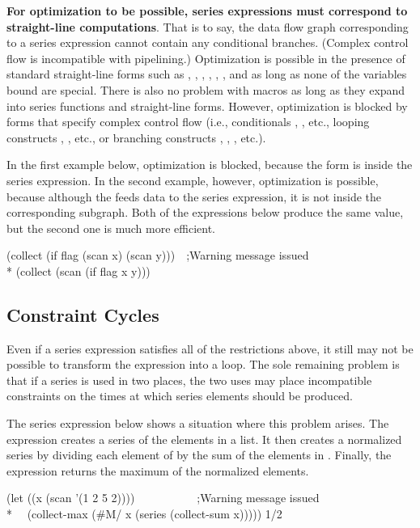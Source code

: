{\bf For optimization to be possible, series expressions must correspond to
straight-line computations}.  That is to say, the data flow graph
corresponding to a series expression cannot contain any conditional
branches.  (Complex control flow is incompatible with pipelining.)
Optimization is possible in the presence of standard straight-line forms
such as , , , , ,
, and  as long
as none of the variables bound are special.  There is also no problem with
macros as long as they expand into series functions and straight-line forms.
However, optimization is blocked by forms that specify complex control flow
(i.e., conditionals , , etc., looping constructs ,
, etc., or branching constructs , , ,
etc.).

In the first example below, optimization is blocked, because the 
form is inside the series expression.  In the second example, however,
optimization is possible, because although the  feeds data to the
series expression, it is not inside the corresponding subgraph.  Both of
the expressions below produce the same value, but the second one is
much more efficient.
\begin{lisp}
(collect (if flag (scan x) (scan y)))~~;{\rm Warning message issued} \\*
(collect (scan (if flag x y))) 
\end{lisp}

\subsection{Constraint Cycles}

Even if a series expression satisfies all of the restrictions above, it
still may not be possible to transform the expression into a loop.  The
sole remaining problem is that if a series is used in two places, the
two uses may place incompatible constraints on the times at which series
elements should be produced.

The series expression below shows a situation where this problem arises.
The expression creates a series  of the elements in a list. It then
creates a normalized series by dividing each element of  by the sum
of the elements in .  Finally, the expression returns the maximum of
the normalized elements.
\begin{lisp}
(let ((x (scan '(1 2 5 2))))~~~~~~~~~~~;{\rm Warning message issued} \\*
~~(collect-max (\#M/ x (series (collect-sum x))))) {\EV} 1/2
\end{lisp}


